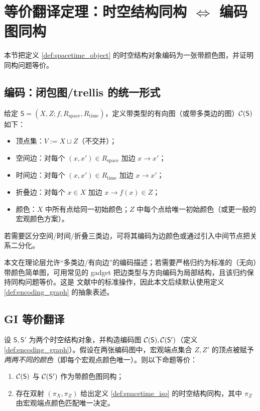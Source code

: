 
\section{等价翻译定理：时空结构同构 \texorpdfstring{$\Leftrightarrow$}{<->} 编码图同构}

本节把定义 \ref{def:spacetime_object} 的时空结构对象编码为一张带颜色图，并证明同构问题等价。

\subsection{编码：闭包图/trellis 的统一形式}

\begin{definition}[编码闭包图]\label{def:encoding_graph}
给定 $\mathsf S=(X,Z; f, R_{\mathrm{space}}, R_{\mathrm{time}})$，定义带类型的有向图（或带多类边的图）$\mathcal{C}(\mathsf S)$ 如下：
\begin{itemize}
  \item 顶点集：$V:=X\sqcup Z$（不交并）；
  \item 空间边：对每个 $(x,x')\in R_{\mathrm{space}}$ 加边 $x\to x'$；
  \item 时间边：对每个 $(x,x')\in R_{\mathrm{time}}$ 加边 $x\to x'$；
  \item 折叠边：对每个 $x\in X$ 加边 $x\to f(x)\in Z$；
  \item 颜色：$X$ 中所有点给同一初始颜色；$Z$ 中每个点给唯一初始颜色（或更一般的宏观颜色方案）。
\end{itemize}
若需要区分空间/时间/折叠三类边，可将其编码为边颜色或通过引入中间节点把关系二分化。
\end{definition}

\begin{remark}
本文在理论层允许“多类边/有向边”的编码描述；若需要严格归约为标准的（无向）带颜色简单图，可用常见的 gadget 把边类型与方向编码为局部结构，且该归约保持同构问题等价。这是 \GI{} 文献中的标准操作，因此本文后续默认使用定义 \ref{def:encoding_graph} 的抽象表述。
\end{remark}

\subsection{GI 等价翻译}

\begin{theorem}\label{thm:gi_translation_spacetime}
设 $\mathsf S,\mathsf S'$ 为两个时空结构对象，并构造编码图 $\mathcal{C}(\mathsf S),\mathcal{C}(\mathsf S')$（定义 \ref{def:encoding_graph}）。假设在两张编码图中，宏观端点集合 $Z,Z'$ 的顶点被赋予\emph{两两不同的颜色}（即每个宏观点颜色唯一）。则以下命题等价：
\begin{enumerate}
  \item $\mathcal{C}(\mathsf S)$ 与 $\mathcal{C}(\mathsf S')$ 作为带颜色图同构；
  \item 存在双射 $(\pi_X,\pi_Z)$ 给出定义 \ref{def:spacetime_iso} 的时空结构同构，其中 $\pi_Z$ 由宏观端点颜色匹配唯一决定。
\end{enumerate}
\end{theorem}


